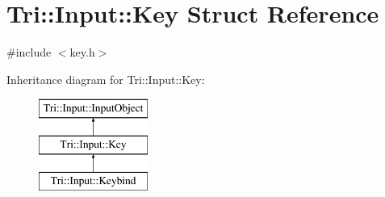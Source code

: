 \hypertarget{struct_tri_1_1_input_1_1_key}{}\section{Tri\+:\+:Input\+:\+:Key Struct Reference}
\label{struct_tri_1_1_input_1_1_key}


{\ttfamily \#include $<$key.\+h$>$}

Inheritance diagram for Tri\+:\+:Input\+:\+:Key\+:\begin{figure}[H]
\begin{center}
\leavevmode
\includegraphics[height=3.000000cm]{struct_tri_1_1_input_1_1_key}
\end{center}
\end{figure}
